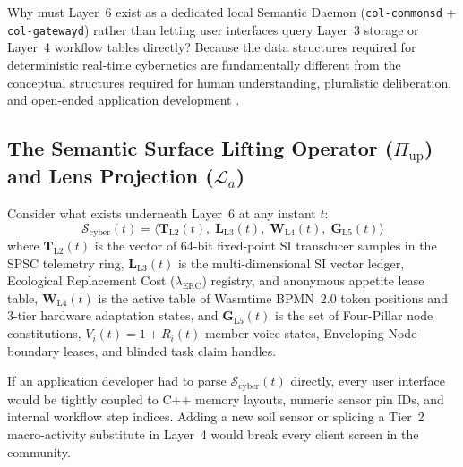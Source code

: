 Why must Layer~6 exist as a dedicated local Semantic Daemon (\texttt{col-commonsd} +
\texttt{col-gatewayd}) rather than letting user interfaces query Layer~3 storage or Layer~4
workflow tables directly? Because the data structures required for deterministic real-time
cybernetics are fundamentally different from the conceptual structures required for human
understanding, pluralistic deliberation, and open-ended application development
\parencite{gruber1993ontology,winograd1986understanding}.

\subsection{The Semantic Surface Lifting Operator ($\Pi_{\mathrm{up}}$) and Lens Projection ($\mathcal{L}_a$)}

Consider what exists underneath Layer~6 at any instant $t$:
\begin{equation}
    \mathcal{S}_{\mathrm{cyber}}(t) = \bigl\langle \mathbf{T}_{\mathrm{L2}}(t),\; \mathbf{L}_{\mathrm{L3}}(t),\; \mathbf{W}_{\mathrm{L4}}(t),\; \mathbf{G}_{\mathrm{L5}}(t) \bigr\rangle
\end{equation}
where $\mathbf{T}_{\mathrm{L2}}(t)$ is the vector of 64-bit fixed-point SI transducer samples in
the SPSC telemetry ring, $\mathbf{L}_{\mathrm{L3}}(t)$ is the multi-dimensional SI vector ledger,
Ecological Replacement Cost ($\lambda_{\mathrm{ERC}}$) registry, and anonymous appetite lease
table, $\mathbf{W}_{\mathrm{L4}}(t)$ is the active table of Wasmtime BPMN~2.0 token positions and
3-tier hardware adaptation states, and $\mathbf{G}_{\mathrm{L5}}(t)$ is the set of Four-Pillar
node constitutions, $V_i(t)=1+R_i(t)$ member voice states, Enveloping Node boundary leases, and
blinded task claim handles.

If an application developer had to parse $\mathcal{S}_{\mathrm{cyber}}(t)$ directly, every user
interface would be tightly coupled to C++ memory layouts, numeric sensor pin IDs, and internal
workflow step indices. Adding a new soil sensor or splicing a Tier~2 macro-activity substitute in
Layer~4 would break every client screen in the community.

